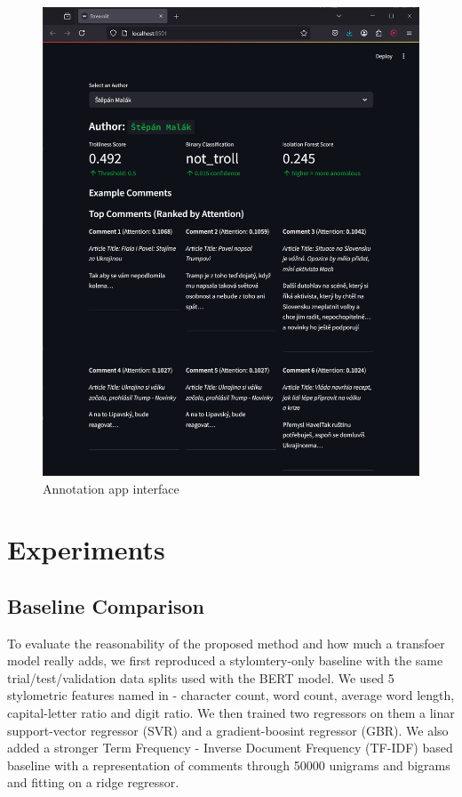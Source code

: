 \documentclass[twoside]{ctuthesis}
\theoremstyle{plain}
\theoremstyle{definition}
\theoremstyle{note}
\begin{document}
\begin{figure}[htbp]          
	\centering                 
	\includegraphics[scale=0.43]{figures/streamlit_app.png}
	\caption{Annotation app interface}    
	\label{fig:my_app}          
\end{figure}

\chapter{Experiments}

\section{Baseline Comparison}
To evaluate the reasonability of the proposed method and how much a transfoer model really adds, we first reproduced a stylomtery-only baseline with the same trial/test/validation data splits used with the BERT model.
We used 5 stylometric features named in \cite{Machova2021Algorithms} - character count, word count, average word length, capital-letter ratio and digit ratio. We then trained two regressors on them a linar support-vector regressor (SVR) and a gradient-boosint regressor (GBR). We also added a stronger Term Frequency - Inverse Document Frequency (TF-IDF) based baseline with a representation of comments through 50000 unigrams and bigrams and fitting on a ridge regressor.\par
\end{document}
